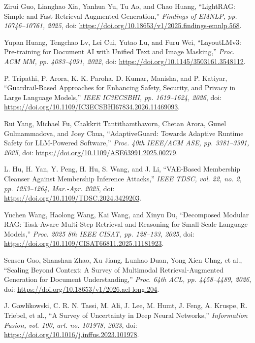  Zirui Guo, Lianghao Xia, Yanhua Yu, Tu Ao, and Chao Huang, ``LightRAG: Simple and Fast Retrieval-Augmented Generation,'' \emph{Findings of EMNLP, pp. 10746--10761, 2025}, doi: \url{https://doi.org/10.18653/v1/2025.findings-emnlp.568}.

 Yupan Huang, Tengchao Lv, Lei Cui, Yutao Lu, and Furu Wei, ``LayoutLMv3: Pre-training for Document AI with Unified Text and Image Masking,'' \emph{Proc. ACM MM, pp. 4083--4091, 2022}, doi: \url{https://doi.org/10.1145/3503161.3548112}.

 P. Tripathi, P. Arora, K. K. Paroha, D. Kumar, Manisha, and P. Katiyar, ``Guardrail-Based Approaches for Enhancing Safety, Security, and Privacy in Large Language Models,'' \emph{IEEE IC3ECSBHI, pp. 1619--1624, 2026}, doi: \url{https://doi.org/10.1109/IC3ECSBHI67834.2026.11469093}.

 Rui Yang, Michael Fu, Chakkrit Tantithamthavorn, Chetan Arora, Gunel Gulmammadova, and Joey Chua, ``AdaptiveGuard: Towards Adaptive Runtime Safety for LLM-Powered Software,'' \emph{Proc. 40th IEEE/ACM ASE, pp. 3381--3391, 2025}, doi: \url{https://doi.org/10.1109/ASE63991.2025.00279}.

 L. Hu, H. Yan, Y. Peng, H. Hu, S. Wang, and J. Li, ``VAE-Based Membership Cleanser Against Membership Inference Attacks,'' \emph{IEEE TDSC, vol. 22, no. 2, pp. 1253--1264, Mar.-Apr. 2025}, doi: \url{https://doi.org/10.1109/TDSC.2024.3429203}.

 Yuchen Wang, Haolong Wang, Kai Wang, and Xinyu Du, ``Decomposed Modular RAG: Task-Aware Multi-Step Retrieval and Reasoning for Small-Scale Language Models,'' \emph{Proc. 2025 8th IEEE CISAT, pp. 128--133, 2025}, doi: \url{https://doi.org/10.1109/CISAT66811.2025.11181923}.

 Sensen Gao, Shanshan Zhao, Xu Jiang, Lunhao Duan, Yong Xien Chng, et al., ``Scaling Beyond Context: A Survey of Multimodal Retrieval-Augmented Generation for Document Understanding,'' \emph{Proc. 64th ACL, pp. 4458--4489, 2026}, doi: \url{https://doi.org/10.18653/v1/2026.acl-long.204}.

 J. Gawlikowski, C. R. N. Tassi, M. Ali, J. Lee, M. Humt, J. Feng, A. Kruspe, R. Triebel, et al., ``A Survey of Uncertainty in Deep Neural Networks,'' \emph{Information Fusion, vol. 100, art. no. 101978, 2023}, doi: \url{https://doi.org/10.1016/j.inffus.2023.101978}.

